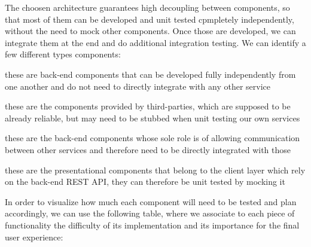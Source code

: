 
The choosen architecture guarantees high decoupling between components, so that most of them
can be developed and unit tested cpmpletely independently, without the need to mock other
components. Once those are developed, we can integrate them at the end and do additional
integration testing. We can identify a few different types components:

\begin{description}[leftmargin=0pt]
     \item[Independent components:] these are back-end components that can be developed fully independently
           from one another and do not need to directly integrate with any other service
     \item[External components:] these are the components provided by third-parties, which are supposed
           to be already reliable, but may need to be stubbed when unit testing our own services
     \item[Integrating components:] these are the back-end components whose sole role is of allowing
           communication between other services and therefore need to be directly integrated with those
     \item[Front-end components:] these are the presentational components that belong to the client layer
           which rely on the back-end REST API, they can therefore be unit tested by mocking it
\end{description}

In order to visualize how much each component will need to be tested and plan accordingly, we can use
the following table, where we associate to each piece of functionality the difficulty of its 
implementation and its importance for the final user experience:

